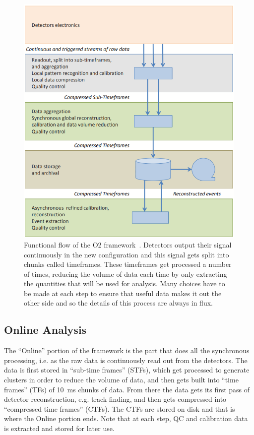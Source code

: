 \begin{figure}[h]
    \begin{center}
        \includegraphics[width=.6\textwidth]{Figs/O2_flow.png}
        \caption{Functional flow of the O2 framework~\cite{O2_Upgrade_TDR}. Detectors output their signal continuously in the new configuration and this signal gets split into chunks called timeframes. These timeframes get processed a number of times, reducing the volume of data each time by only extracting the quantities that will be used for analysis. Many choices have to be made at each step to ensure that useful data makes it out the other side and so the details of this process are always in flux.}
        \label{fig:O2_flow}
    \end{center}
\end{figure}

\subsection{Online Analysis}
The ``Online'' portion of the framework is the part that does all the synchronous processing, i.e. as the raw data is continuously read out from the detectors. The data is first stored in ``sub-time frames'' (STFs), which get processed to generate clusters in order to reduce the volume of data, and then gets built into ``time frames'' (TFs) of \SI{10}{\milli\second} chunks of data. From there the data gets its first pass of detector reconstruction, e.g. track finding, and then gets compressed into ``compressed time frames'' (CTFs). The CTFs are stored on disk and that is where the Online portion ends. Note that at each step, QC and calibration data is extracted and stored for later use.

